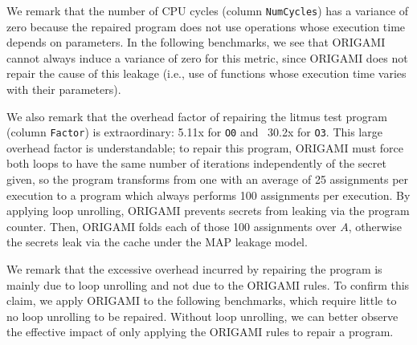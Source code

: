 {We remark that the number of CPU cycles (column \texttt{NumCycles}) has a variance of zero because the repaired program does not use operations whose execution time depends on parameters. 
In the following benchmarks, we see that ORIGAMI cannot always induce a variance of zero for this metric, since ORIGAMI does not repair the cause of this leakage (i.e., use of functions whose execution time varies with their parameters).

We also remark that the overhead factor of repairing the litmus test program (column \texttt{Factor}) is extraordinary: 5.11x for \texttt{O0} and ~30.2x for \texttt{O3}. This large overhead factor is understandable; to repair this program, ORIGAMI must force both loops to have the same number of iterations independently of the secret given, so the program transforms from one with an average of 25 assignments per execution to a program which always performs 100 assignments per execution. By applying loop unrolling, ORIGAMI prevents secrets from leaking via the program counter. Then, ORIGAMI folds each of those 100 assignments over $A$, otherwise the secrets leak via the cache under the MAP leakage model. 

We remark that the excessive overhead incurred by repairing the program is mainly due to loop unrolling and not due to the ORIGAMI rules. To confirm this claim, we apply ORIGAMI to the following benchmarks, which require little to no loop unrolling to be repaired. Without loop unrolling, we can better observe the effective impact of only applying the ORIGAMI rules to repair a program.






}
